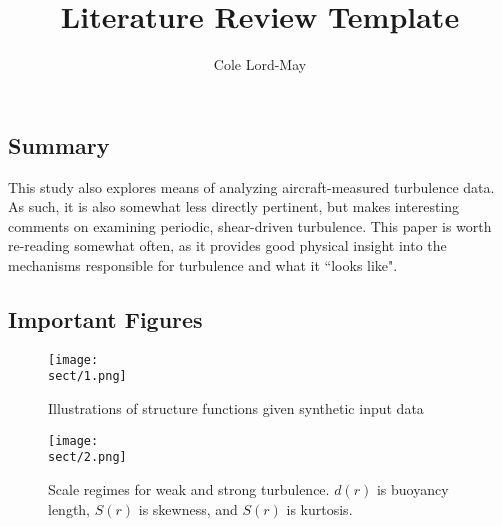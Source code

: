 \documentclass{article}
\title{Literature Review Template}
\author{Cole Lord-May}
\date{}
\begin{document}
\maketitle
\tableofcontents
\newpage


\def \sect {Mahrt1987}
\section{\citeauthor{\sect} \citeyear{\sect}}
\textbf{\citefield{\sect}{title}\nocite{\sect}}
\subsection*{Summary}
This study also explores means of analyzing aircraft-measured turbulence data. As such, it is also somewhat less directly pertinent, but makes interesting comments on examining periodic, shear-driven turbulence. This paper is worth re-reading somewhat often, as it provides good physical insight into the mechanisms responsible for turbulence and what it ``looks like".
\subsection*{Important Figures}
\begin{figure}[ht]
    \centering
    \vspace{-4mm}
    \texttt{[image: \\sect/1.png]}
    \vspace{-4mm}
    \caption{Illustrations of structure functions given synthetic input data}
    \label{f:mahrt1987_1}
\end{figure}
\begin{figure}[ht]
    \centering
    \vspace{-4mm}
    \texttt{[image: \\sect/2.png]}
    \vspace{-4mm}
    \caption{Scale regimes for weak and strong turbulence. \(d(r)\) is buoyancy length, \(S(r)\) is skewness, and \(S(r)\) is kurtosis.}
    \label{f:mahrt1987_2}
\end{figure}
\end{document}
